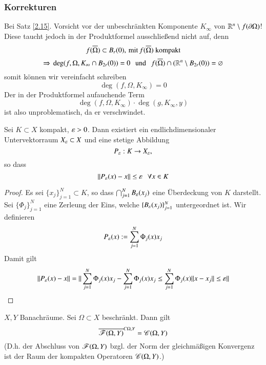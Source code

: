 \subsubsection*{Korrekturen}

Bei Satz \ref{2.15}. Vorsicht vor der unbeschränkten Komponente $K_\infty$ von $\mathbb{R}^n\setminus f(\partial
\Omega)$! Diese taucht jedoch in der Produktformel ausschließend nicht auf, denn
\[
    f(\overline \Omega)\subset B_r(0), \, \text{mit}\, f(\overline \Omega) \text{ kompakt}
\]
\[
    \Rightarrow \, \deg(f,\Omega,K_\infty\cap B_{2r}(0))=0 \hspace{.25cm} \text{und} \hspace{.25cm} f(\overline \Omega) \cap (\mathbb{R}^n\setminus
    B_{2r}(0))=\varnothing
\]
somit können wir vereinfacht schreiben
\[
    \deg(f,\Omega,K_\infty)=0
\]
Der in der Produktformel aufauchende Term
\[
    \deg(f,\Omega,K_\infty)\cdot \deg(g,K_\infty,y)
\]
ist also unproblematisch, da er verschwindet.\\[0.5cm]

\begin{lem}\label{3.5}
    Sei $K\subset X$ kompakt, $\varepsilon>0$. Dann existiert ein endlichdimensionaler Untervektorraum $X_\varepsilon
    \subset X$ und eine stetige Abbildung
    \[
        P_\varepsilon:K\rightarrow X_\varepsilon,
    \]
    so dass
    \[
        \|P_\varepsilon(x)-x\|\leq \varepsilon \hspace{.25cm} \forall x\in K
    \]
\end{lem}

\begin{proof}
    Es sei $\{x_j\}_{j=1}^N\subset K$, so dass $\bigcap _{j=1}^NB_\varepsilon(x_j)$ eine Überdeckung von $K$
    darstellt. Sei $\{\Phi_j\}_{j=1}^N$ eine Zerleung der Eins, welche $\{B_\varepsilon(x_j)\}_{j=1}^N$
    untergeordnet ist. Wir definieren
    \[
        P_\varepsilon(x):= \sum_{j=1}^N \Phi_j(x)x_j
    \]
    Damit gilt
    \[
        \|P_\varepsilon(x)-x\|=\|\sum_{j=1}^N\Phi_j(x)x_j-\sum_{j=1}^N \Phi_j(x)x_j\leq \sum_{j=1}^N \Phi_j(x)
        \|x-x_j\|\leq \varepsilon\|
    \]
\end{proof}

\begin{theorem}\label{3.6}
    $X,Y$ Banachräume. Sei $\Omega\subset X$ beschränkt. Dann gilt
    \[
        \overline{\mathscr F(\Omega,Y)}^{C{\Omega,Y}}=\mathscr C(\Omega,Y)
    \]
    (D.h. der Abschluss von $\mathscr F(\Omega,Y)$ bzgl. der Norm der gleichmäßigen Konvergenz ist der Raum
     der kompakten Operatoren $\mathscr C(\Omega,Y)$.)
\end{theorem}

